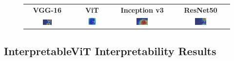 \documentclass[a4paper,12pt]{report}
\begin{document}
\begin{figure}[H]
    \centering
    \setlength{\tabcolsep}{1pt}
    \begin{tabular}{cccc}
    \textbf{VGG-16} & \textbf{ViT} & \textbf{Inception v3} & \textbf{ResNet50} \\
    
    \includegraphics[width=0.22\textwidth]{images/appendix/modelgraph/vgg/correct/Slaty_Backed_Gull/480 (45).jpeg} &
    \includegraphics[width=0.22\textwidth]{images/appendix/modelgraph/vit/correct/Slaty_Backed_Gull/480 (45).jpeg} &
    \includegraphics[width=0.22\textwidth]{images/appendix/modelgraph/inception/correct/Slaty_Backed_Gull/480 (45).jpeg} &
    \includegraphics[width=0.22\textwidth]{images/appendix/modelgraph/resnet/correct/Slaty_Backed_Gull/480 (45).jpeg} \\
    \end{tabular}

    \label{fig:interpretability_slaty_10}
\end{figure}


\subsection{InterpretableViT Interpretability Results}
\end{document}
